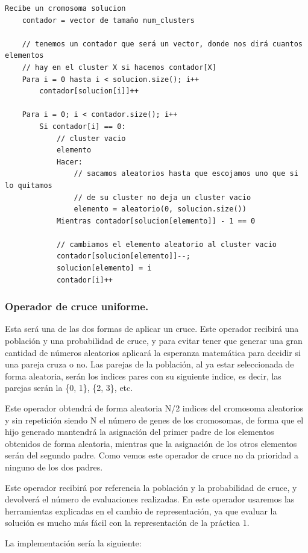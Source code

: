 \documentclass[12pt, spanish]{article}
\begin{document}
\begin{lstlisting}
Recibe un cromosoma solucion
	contador = vector de tamaño num_clusters
	
	// tenemos un contador que será un vector, donde nos dirá cuantos elementos 
	// hay en el cluster X si hacemos contador[X]
	Para i = 0 hasta i < solucion.size(); i++
		contador[solucion[i]]++
		
	Para i = 0; i < contador.size(); i++
		Si contador[i] == 0:
			// cluster vacio
			elemento
			Hacer:
				// sacamos aleatorios hasta que escojamos uno que si lo quitamos
				// de su cluster no deja un cluster vacio
				elemento = aleatorio(0, solucion.size()) 
			Mientras contador[solucion[elemento]] - 1 == 0
				
			// cambiamos el elemento aleatorio al cluster vacio
			contador[solucion[elemento]]--;
			solucion[elemento] = i
			contador[i]++		
\end{lstlisting}

\subsubsection{Operador de cruce uniforme.}

Esta será una de las dos formas de aplicar un cruce. Este operador recibirá una población y una probabilidad de cruce, y para evitar tener que generar una gran cantidad de números aleatorios aplicará la esperanza matemática para decidir si una pareja cruza o no. Las parejas de la población, al ya estar seleccionada de forma aleatoria, serán los indices pares con su siguiente indice, es decir, las parejas serán la \{0, 1\}, \{2, 3\}, etc.

 Este operador obtendrá de forma aleatoria N/2 indices del cromosoma aleatorios y sin repetición siendo N el número de genes de los cromosomas, de forma que el hijo generado mantendrá la asignación del primer padre de los elementos obtenidos de forma aleatoria, mientras que la asignación de los otros elementos serán del segundo padre. Como vemos este operador de cruce no da prioridad a ninguno de los dos padres.
 
Este operador recibirá por referencia la población y la probabilidad de cruce, y devolverá el número de evaluaciones realizadas. En este operador usaremos las herramientas explicadas en el cambio de representación, ya que evaluar la solución es mucho más fácil con la representación de la práctica 1.
 
La implementación sería la siguiente:
\end{document}
